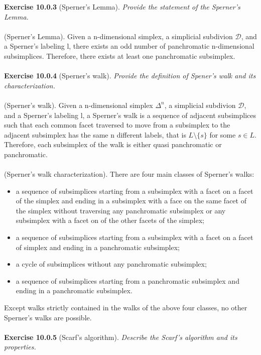 \textbf{Exercise 10.0.3} (Sperner’s Lemma). \textit{Provide the statement of the Sperner’s Lemma.}\\\\
(Sperner’s Lemma). Given a n-dimensional simplex, a simplicial subdivion $ \mathcal{D} $, and a Sperner’s labeling l, there exists an odd number of panchromatic n-dimensional subsimplices. Therefore, there exists at least one panchromatic subsimplex.\\\\
\textbf{Exercise 10.0.4} (Sperner’s walk). \textit{Provide the definition of Spener’s walk and its characterization.}\\\\
(Sperner’s walk). Given a n-dimensional simplex $\Delta^n$, a simplicial subdivion $ \mathcal{D} $, and a Sperner’s labeling l, a Sperner’s walk is a sequence of adjacent subsimplices such that each common facet traversed to move from a subsimplex to the adjacent subsimplex has the same n different labels, that is $L \setminus \{s\}$ for some $s \in L$.
Therefore, each subsimplex of the walk is either quasi panchromatic or panchromatic.\\\\
(Sperner’s walk characterization). There are four main classes of Sperner’s walks:
\begin{itemize}
\item a sequence of subsimplices starting from a subsimplex with a facet on a facet of the simplex and ending in a subsimplex with a face on the same facet of the simplex without traversing any panchromatic subsimplex or any subsimplex with a facet on of the other facets of the simplex;
\item a sequence of subsimplices starting from a subsimplex with a facet on a facet of simplex and ending in a panchromatic subsimplex;
\item a cycle of subsimplices without any panchromatic subsimplex;
\item a sequence of subsimplices starting from a panchromatic subsimplex and ending in a panchromatic subsimplex.
\end{itemize}
Except walks strictly contained in the walks of the above four classes, no other Sperner’s walks are possible.\\\\
\textbf{Exercise 10.0.5} (Scarf’s algorithm). \textit{Describe the Scarf’s algorithm and its properties.}\\\\
